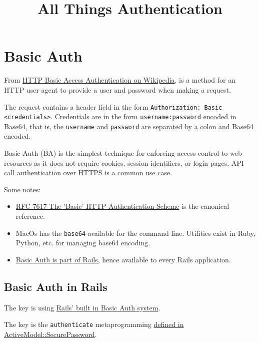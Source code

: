 \documentclass{article}
\title{All Things Authentication}
\begin{document}
\maketitle

\tableofcontents


\section{Basic Auth}

From \href{https://en.wikipedia.org/wiki/Basic_access_authentication}{%
  HTTP Basic Access Authentication on Wikipedia}, is a method for an HTTP
user agent to provide a user and password when making a request.

The request contains a header field in the form \texttt{Authorization: Basic
 <credentials>}. Credentials are in the form \texttt{username:password} encoded in
Base64, that is, the \texttt{username} and \texttt{password} are separated by a colon
and Base64 encoded.

Basic Auth (BA) is the simplest technique for enforcing access control to
web resources as it does not require cookies, session identifiers, or
login pages. API call authentication over HTTPS is a common use case.

Some notes:
\begin{itemize}
  \item \href{https://tools.ietf.org/html/rfc7617}{%
      RFC 7617 The 'Basic' HTTP Authentication Scheme} is the
    canonical reference.
  \item MacOs has the \texttt{base64} available for the command line. Utilities
    exist in Ruby, Python, etc. for managing base64 encoding.
  \item \href{https://api.rubyonrails.org/classes/ActionController/HttpAuthentication/Basic.html}{%
      Basic Auth is part of Rails}, hence available to every Rails application.
\end{itemize}

\subsection{Basic Auth in Rails}

The key is using \href{https://github.com/rails/rails/blob/master/actionpack/lib/action_controller/metal/http_authentication.rb}{%
Rails' built in Basic Auth system}.

The key is the \texttt{authenticate} metaprogramming
\href{https://github.com/rails/rails/blob/master/activemodel/lib/active_model/secure_password.rb#L119}{%
  defined in ActiveModel::SecurePassword}.
\end{document}
